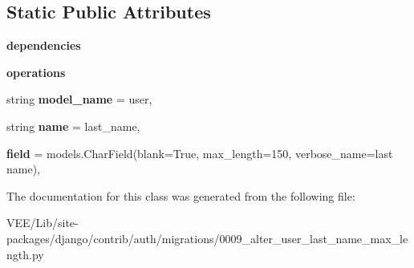 \subsection*{Static Public Attributes}
\begin{DoxyCompactItemize}
\item 
\mbox{\label{classdjango_1_1contrib_1_1auth_1_1migrations_1_10009__alter__user__last__name__max__length_1_1_migration_a4040dd7c4a1e3d4101c1a5a84762cabc}} 
{\bfseries dependencies}
\item 
\mbox{\label{classdjango_1_1contrib_1_1auth_1_1migrations_1_10009__alter__user__last__name__max__length_1_1_migration_aefb7cdb47524d9a8391af0742910d04f}} 
{\bfseries operations}
\item 
\mbox{\label{classdjango_1_1contrib_1_1auth_1_1migrations_1_10009__alter__user__last__name__max__length_1_1_migration_afe0ab0843a51d12baf21068510d5648f}} 
string {\bfseries model\+\_\+name} = \textquotesingle{}user\textquotesingle{},
\item 
\mbox{\label{classdjango_1_1contrib_1_1auth_1_1migrations_1_10009__alter__user__last__name__max__length_1_1_migration_a3eed9408a3174d38369873be5721d6d4}} 
string {\bfseries name} = \textquotesingle{}last\+\_\+name\textquotesingle{},
\item 
\mbox{\label{classdjango_1_1contrib_1_1auth_1_1migrations_1_10009__alter__user__last__name__max__length_1_1_migration_a51c732283b7b797eccbc5c660f7e8b24}} 
{\bfseries field} = models.\+Char\+Field(blank=True, max\+\_\+length=150, verbose\+\_\+name=\textquotesingle{}last name\textquotesingle{}),
\end{DoxyCompactItemize}


The documentation for this class was generated from the following file\+:\begin{DoxyCompactItemize}
\item 
V\+E\+E/\+Lib/site-\/packages/django/contrib/auth/migrations/0009\+\_\+alter\+\_\+user\+\_\+last\+\_\+name\+\_\+max\+\_\+length.\+py\end{DoxyCompactItemize}
